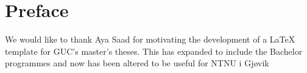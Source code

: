\chapter*{Preface} %
\label{chap:preface}

We would like to thank Aya Saad for motivating the development of a \LaTeX{} template
 for GUC's master's theses.  This has expanded to include the Bachelor programmes and now has been altered to be useful for NTNU i Gj\o{}vik
 
 